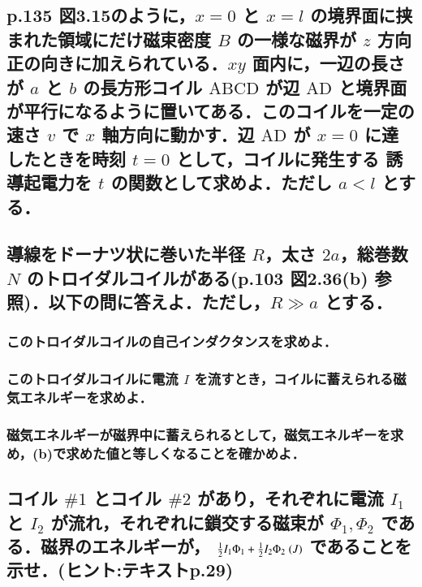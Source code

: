 \documentclass[a4paper, 12pt]{bxjsarticle}
\begin{document}
\begin{samepage}
\subsection{p.135 図3.15のように，\(x=0\) と \(x=l\) の境界面に挟まれた領域にだけ磁束密度 \(B\) の一様な磁界が \(z\) 方向正の向きに加えられている．\(xy\) 面内に，一辺の長さが \(a\) と \(b\) の長方形コイル%
 \(\mathrm{ABCD}\) が辺 \(\mathrm{AD}\) と境界面が平行になるように置いてある．このコイルを一定の速さ \(v\) で \(x\) 軸方向に動かす．辺 \(\mathrm{AD}\) が \(x=0\) に達したときを時刻 \(t=0\) として，コイルに発生する%
 誘導起電力を \(t\) の関数として求めよ．ただし \(a<l\) とする．}
\vspace*{12em}
\subsection{導線をドーナツ状に巻いた半径 \(R\)，太さ \(2a\)，総巻数 \(N\) のトロイダルコイルがある(p.103 図2.36(b) 参照)．以下の問に答えよ．ただし，\(R\gg a\) とする．}
\subsubsection{このトロイダルコイルの自己インダクタンスを求めよ．}
\vspace*{6em}
\subsubsection{このトロイダルコイルに電流 \(I\) を流すとき，コイルに蓄えられる磁気エネルギーを求めよ．}
\vspace*{6em}
\subsubsection{磁気エネルギーが磁界中に蓄えられるとして，磁気エネルギーを求め，(b)で求めた値と等しくなることを確かめよ．}
\vspace*{6em}
\end{samepage}
\newpage
\subsection{コイル \(\#1\) とコイル \(\#2\) があり，それぞれに電流 \(I_1\) と \(I_2\) が流れ，それぞれに鎖交する磁束が \(\Phi_1, \Phi_2\) である．磁界のエネルギーが， \(\frac{1}{2} I_1 \Phi_1 + \frac{1}{2} I_2 \Phi_2\; \si(J)\) であることを示せ．(ヒント:テキストp.29)}
\end{document}
